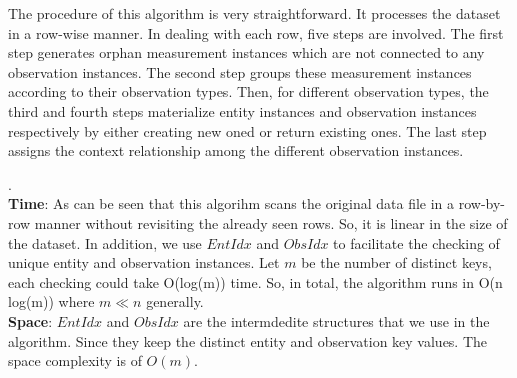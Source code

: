 \documentclass[10pt]{article}
\begin{document}
The procedure of this algorithm is very straightforward. 
It processes the dataset in a row-wise manner. 
In dealing with each row, five steps are involved. 
The first step generates orphan measurement instances which are not connected to any observation instances.
The second step groups these measurement instances according to their observation types.
Then, for different observation types, the third and fourth steps materialize entity instances and observation instances respectively by either creating new oned or return existing ones. 
The last step assigns the context relationship among the different observation instances. 



. \\
{\bf Time}: As can be seen that  this algorihm scans the original data file in a row-by-row manner without revisiting the already seen rows. So, it is linear in the size of the dataset. 
In addition, we use $EntIdx$ and $ObsIdx$ to facilitate the checking of unique entity and observation instances. Let $m$ be the number of distinct keys, each checking could take O(log(m)) time. 
So, in total, the algorithm runs in O(n log(m)) where $m\ll n$ generally. \\
{\bf Space}: $EntIdx$ and $ObsIdx$ are the intermdedite structures that we use in the algorithm. Since they keep the distinct entity and observation key values. The space complexity is of $O(m)$. 
\end{document}
